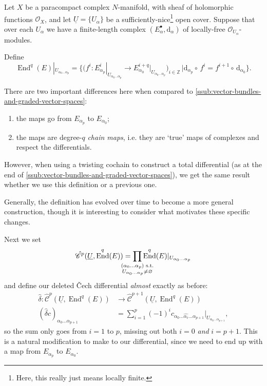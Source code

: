 \documentclass[11pt,notitlepage]{article}
\numberwithin{equation}{subsection}
\DeclareMathOperator{\End}{End}
\renewcommand{\d}{\mathrm{d}}
\renewcommand{\C}{\mathscr{C}}
\begin{document}
                \bigskip

                Let $X$ be a paracompact complex $N$-manifold, with sheaf of holomorphic functions $\mathcal{O}_X$, and let $\underline{U}=\{U_\alpha\}$ be a sufficiently-nice\footnote{Here, this really just means locally finite.} open cover.
                Suppose that over each $U_\alpha$ we have a finite-length complex $(E_\alpha^\bullet,\d_\alpha)$ of locally-free $\mathcal{O}_{U_\alpha}$-modules.

                Define 
                \[
                    \End^q(E)|_{U_{\alpha_0\ldots\alpha_p}} = \Big\{\big(f^i\colon E_{\alpha_p}^i|_{U_{\alpha_0\ldots\alpha_p}}\to E_{\alpha_0}^{i+q}|_{U_{\alpha_0\ldots\alpha_p}}\big)_{i\in\mathbb{Z}} \,\Big| \d_{\alpha_p}\circ\,f^i = f^{i+1}\circ\,\d_{\alpha_0}\Big\}.
                \]

                \begin{note}
                    There are two important differences here when compared to \cref{ssub:vector-bundles-and-graded-vector-spaces}:
                    \begin{enumerate}
                        \item the maps go from $E_{\alpha_p}$ to $E_{\alpha_0}$;
                        \item the maps are degree-$q$ \textit{chain maps}, i.e. they are `true' maps of complexes and respect the differentials.
                    \end{enumerate}

                    However, when using a twisting cochain to construct a total differential (as at the end of \cref{ssub:vector-bundles-and-graded-vector-spaces}), we get the same result whether we use this definition or a previous one.

                    Generally, the definition has evolved over time to become a more general construction, though it is interesting to consider what motivates these specific changes.
                \end{note}
                
                Next we set
                \[
                    \hat{\C}^p(\underline{U},\End^q(E)) = \smashoperator{\prod_{\substack{(\alpha_0\ldots\alpha_p)\text{ s.t.}\\U_{\alpha_0\ldots\alpha_p}\neq\varnothing}}}\End^q(E)|_{U_{\alpha_0\ldots\alpha_p}}
                \]
                and define our deleted \v{C}ech differential \textit{almost} exactly as before:
                \begin{align*}
                    \hat{\delta}\colon\hat{\C}^p(\underline{U},\End^q(E)) &\to \hat{\C}^{p+1}(\underline{U},\End^q(E))\\
                    (\hat{\delta}c)_{\alpha_0\ldots\alpha_{p+1}} &= \sum_{i=1}^p(-1)^ic_{\alpha_0\ldots\hat{\alpha_i}\ldots\alpha_{p+1}}|_{U_{\alpha_0\ldots\alpha_{p+1}}},
                \end{align*}
                so the sum only goes from $i=1$ to $p$, missing out both $i=0$ \textit{and} $i=p+1$.
                This is a natural modification to make to our differential, since we need to end up with a map from $E_{\alpha_p}$ to $E_{\alpha_0}$.
\end{document}
